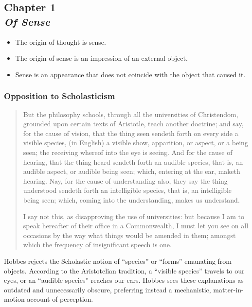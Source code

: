     \subsection[Of Sense]{Chapter 1 \\ \textit{Of Sense}}

        \begin{remark}
            \begin{itemize}
                \item The origin of thought is sense.
                \item The origin of sense is an impression of an external object.
                \item Sense is an appearance that does not coincide with the object that caused it.
            \end{itemize}
        \end{remark}

        \subsubsection{Opposition to Scholasticism}

            \begin{quote}
                But the philosophy schools, through all the universities of Christendom, grounded upon certain texts of Aristotle, teach another doctrine; and say, for the cause of vision, that the thing seen sendeth forth on every side a visible species, (in English) a visible show, apparition, or aspect, or a being seen; the receiving whereof into the eye is seeing. And for the cause of hearing, that the thing heard sendeth forth an audible species, that is, an audible aspect, or audible being seen; which, entering at the ear, maketh hearing. Nay, for the cause of understanding also, they say the thing understood sendeth forth an intelligible species, that is, an intelligible being seen; which, coming into the understanding, makes us understand.

                I say not this, as disapproving the use of universities: but because I am to speak hereafter of their office in a Commonwealth, I must let you see on all occasions by the way what things would be amended in them; amongst which the frequency of insignificant speech is one.
            \end{quote}

            Hobbes rejects the Scholastic notion of “species” or “forms” emanating from objects. According to the Aristotelian tradition, a “visible species” travels to our eyes, or an “audible species” reaches our ears. Hobbes sees these explanations as outdated and unnecessarily obscure, preferring instead a mechanistic, matter-in-motion account of perception.


